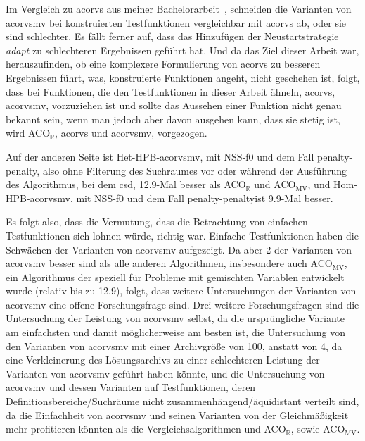 \documentclass[fontsize=12, a4aper]{scrartcl}
\begin{document}
	Im Vergleich zu \acl{acorvs} aus meiner Bachelorarbeit~\cite{FCM_2019}, schneiden die Varianten von \acl{acorvsmv} bei konstruierten Testfunktionen vergleichbar mit \ac{acorvs} ab, oder sie sind schlechter. Es fällt ferner auf, dass das Hinzufügen der Neustartstrategie \textit{adapt} zu schlechteren Ergebnissen geführt hat. Und da das Ziel dieser Arbeit war, herauszufinden, ob eine komplexere Formulierung von \ac{acorvs} zu besseren Ergebnissen führt, was, konstruierte Funktionen angeht, nicht geschehen ist, folgt, dass bei Funktionen, die den Testfunktionen in dieser Arbeit ähneln, \ac{acorvs}, \ac{acorvsmv}, vorzuziehen ist und sollte das Aussehen einer Funktion nicht genau bekannt sein, wenn man jedoch aber davon ausgehen kann, dass sie stetig ist, wird ACO\(_\mathbb{R}\), \ac{acorvs} und \ac{acorvsmv}, vorgezogen.\hfill\newline
	
	Auf der anderen Seite ist Het-HPB-\ac{acorvsmv}, mit NSS-f0 und dem Fall \glqq penalty-penalty\grqq, also ohne Filterung des Suchraumes vor oder während der Ausführung des Algorithmus, bei dem \acl{csd}, 12.9-Mal besser als ACO\(_\mathbb{R}\) und ACO\(_\text{MV}\), und Hom-HPB-\ac{acorvsmv}, mit NSS-f0 und dem Fall \glqq penalty-penalty\grqq ist 9.9-Mal besser.\hfill\newline
	
	Es folgt also, dass die Vermutung, dass die Betrachtung von einfachen Testfunktionen sich lohnen würde, richtig war. Einfache Testfunktionen haben die Schwächen der Varianten von \ac{acorvsmv} aufgezeigt. Da aber 2 der Varianten von \ac{acorvsmv} besser sind als alle anderen Algorithmen, insbesondere auch ACO\(_\text{MV}\), ein Algorithmus der speziell für Probleme mit gemischten Variablen entwickelt wurde (relativ bis zu 12.9), folgt, dass weitere Untersuchungen der Varianten von \ac{acorvsmv} eine offene Forschungsfrage sind. Drei weitere Forschungsfragen sind die Untersuchung der Leistung von \acl{acorvsmv} selbst, da die ursprüngliche Variante am einfachsten und damit möglicherweise am besten ist, die Untersuchung von den Varianten von \ac{acorvsmv} mit einer Archivgröße von 100, anstatt von 4, da eine Verkleinerung des Lösungsarchivs zu einer schlechteren Leistung der Varianten von \ac{acorvsmv} geführt haben könnte, und die Untersuchung von \ac{acorvsmv} und dessen Varianten auf Testfunktionen, deren Definitionsbereiche/Suchräume nicht zusammenhängend/äquidistant verteilt sind, da die Einfachheit von \ac{acorvsmv} und seinen Varianten von der Gleichmäßigkeit mehr profitieren könnten als die Vergleichsalgorithmen und ACO\(_\mathbb{R}\), sowie ACO\(_\text{MV}\).
	
\end{document}
